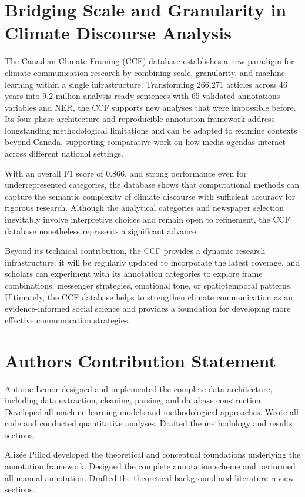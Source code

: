 \documentclass[12pt]{article}
\renewcommand\_{\texttt{\detokenize{_}\allowbreak}}
\begin{document}
\section{Bridging Scale and Granularity in Climate Discourse Analysis}

The Canadian Climate Framing (CCF) database establishes a new paradigm for climate communication research by combining scale, granularity, and machine learning within a single infrastructure. Transforming 266,271 articles across 46 years into 9.2 million analysis ready sentences with 65 validated annotations variables and NER, the CCF supports new analyses that were impossible before. Its four phase architecture and reproducible annotation framework address longstanding methodological limitations and can be adapted to examine contexts beyond Canada, supporting comparative work on how media agendas interact across different national settings. 

With an overall F1 score of 0.866, and strong performance even for underrepresented categories, the database shows that computational methods can capture the semantic complexity of climate discourse with sufficient accuracy for rigorous research. Although the analytical categories and newspaper selection inevitably involve interpretive choices and remain open to refinement, the CCF database nonetheless represents a significant advance. 

Beyond its technical contribution, the CCF provides a dynamic research infrastructure: it will be regularly updated to incorporate the latest coverage, and scholars can experiment with its annotation categories to explore frame combinations, messenger strategies, emotional tone, or spatiotemporal patterns. Ultimately, the CCF database helps to strengthen climate communication as an evidence-informed social science and provides a foundation for developing more effective communication strategies.

\section{Authors Contribution Statement}

Antoine Lemor designed and implemented the complete data architecture, including data extraction, cleaning, parsing, and database construction. Developed all machine learning models and methodological approaches. Wrote all code and conducted quantitative analyses. Drafted the methodology and results sections.

Alizée Pillod developed the theoretical and conceptual foundations underlying the annotation framework. Designed the complete annotation scheme and performed all manual annotation. Drafted the theoretical background and literature review sections.
\end{document}
